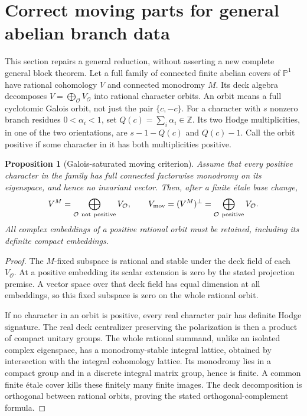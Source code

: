 \documentclass[11pt]{article}
\newtheorem{proposition}[theorem]{Proposition}
\theoremstyle{remark}
\newcommand{\Z}{\mathbb Z}
\newcommand{\PP}{\mathbb P}
\begin{document}
\section{Correct moving parts for general abelian branch data}
This section repairs a general reduction, without asserting a new
complete general block theorem.
Let a full family of connected finite abelian covers of \(\PP^1\)
have rational cohomology \(V\) and connected monodromy \(M\).
Its deck algebra decomposes \(V=\bigoplus_{\mathcal O}V_{\mathcal O}\)
into rational character orbits.  An orbit means a full cyclotomic
Galois orbit, not just the pair \(\{c,-c\}\).
For a character with \(s\) nonzero branch residues
\(0<\alpha_i<1\), set \(Q(c)=\sum_i\alpha_i\in\Z\).
Its two Hodge multiplicities, in one of the two orientations, are
\(s-1-Q(c)\) and \(Q(c)-1\).
Call the orbit positive if some character in it has both
multiplicities positive.

\begin{proposition}[Galois-saturated moving criterion]\label{prop:moving}
Assume that every positive character in the family has full connected
factorwise monodromy on its eigenspace, and hence no invariant vector.
Then, after a finite \'etale base change,
\[
 V^M=\bigoplus_{\mathcal O\ {\rm not\ positive}}V_{\mathcal O},
 \qquad
 V_{\rm mov}=(V^M)^\perp
      =\bigoplus_{\mathcal O\ {\rm positive}}V_{\mathcal O}.
\]
All complex embeddings of a positive rational orbit must be retained,
including its definite compact embeddings.
\end{proposition}
\begin{proof}
The \(M\)-fixed subspace is rational and stable under the deck field
of each \(V_{\mathcal O}\).  At a positive embedding its scalar
extension is zero by the stated projection premise.  A vector space
over that deck field has equal dimension at all embeddings, so this
fixed subspace is zero on the whole rational orbit.

If no character in an orbit is positive, every real character pair
has definite Hodge signature.  The real deck centralizer preserving
the polarization is then a product of compact unitary groups.
The whole rational summand, unlike an isolated complex eigenspace,
has a monodromy-stable integral lattice, obtained by intersection
with the integral cohomology lattice.  Its monodromy lies in a
compact group and in a discrete integral matrix group, hence is
finite.  A common finite \'etale cover kills these finitely many
finite images.  The deck decomposition is orthogonal between
rational orbits, proving the stated orthogonal-complement formula.
\end{proof}
\end{document}
